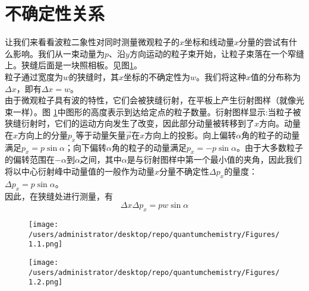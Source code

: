 	\section{不确定性关系}
	让我们来看看波粒二象性对同时测量微观粒子的$x$坐标和线动量$x$分量的尝试有什么影响。我们从一束动量为$p$、沿$y$方向运动的粒子束开始，让粒子束落在一个窄缝上。狭缝后面是一块照相板。见图\ref{fig:1.1}。\\
	\indent 粒子通过宽度为$w$的狭缝时，其$x$坐标的不确定性为$w$。我们将这种$x$值的分布称为$\Delta x$，即有$\Delta x = w$。\\
	\indent 由于微观粒子具有波的特性，它们会被狭缝衍射，在平板上产生衍射图样（就像光束一样）。图 \ref{fig:1.1}中图形的高度表示到达给定点的粒子数量。衍射图样显示:当粒子被狭缝衍射时，它们的运动方向发生了改变，因此部分动量被转移到了$x$方向。动量在$x$方向上的分量$p_x$等于动量矢量$\overrightarrow{p}$在$x$方向上的投影。向上偏转$\alpha$角的粒子的动量满足$p_x=p\sin \alpha$；向下偏转$\alpha$角的粒子的动量满足$p_x=-p \sin \alpha$。由于大多数粒子的偏转范围在$-\alpha$到$\alpha$之间，其中$\alpha$是与衍射图样中第一个最小值的夹角，因此我们将以中心衍射峰中动量值的一般作为动量$x$分量不确定性$\Delta p_x$的量度：$\Delta p_x = p \sin \alpha$。\\
	\indent 因此，在狭缝处进行测量，有
	\begin{equation}
		\Delta x \Delta p_x = pw \sin \alpha 
		\label{eq:1.6 diffract equation on x}
	\end{equation}
	
	\begin{figure}[h!]
		\centering
		\texttt{[image: /users/administrator/desktop/repo/quantumchemistry/Figures/1.1.png]}  %
		\caption{}
		\label{fig:1.1}
	\end{figure}
	\begin{figure}[h!]
		\centering
		\texttt{[image: /users/administrator/desktop/repo/quantumchemistry/Figures/1.2.png]}
		\caption{}
		\label{fig:1.2}
	\end{figure}
	
